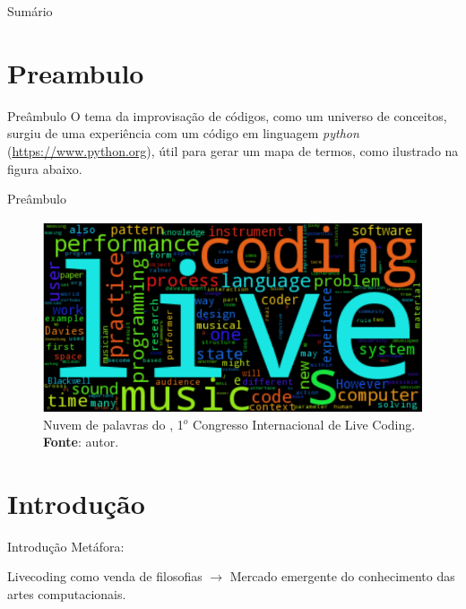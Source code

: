 \documentclass[aspectratio=169]{beamer}
\begin{document}


\begin{frame}{Sumário}
\tableofcontents
\end{frame}

\section{Preambulo}
\begin{frame}{Preâmbulo}
O tema da improvisação de códigos, como um universo de conceitos, surgiu de uma experiência com um código em linguagem \emph{python} (\url{https://www.python.org}), útil para gerar um mapa de termos, como ilustrado na figura abaixo.
\end{frame}

\begin{frame}{Preâmbulo}
\begin{figure}
\centering
\includegraphics[scale=0.8]{imagens/nuvem.png}
\caption{Nuvem de palavras do ,  1$^o$ Congresso Internacional de Live Coding. \textbf{Fonte}: autor.}
\label{fig:nuvemlivecoding}
\end{figure}
\end{frame}

\section{Introdução}
\begin{frame}{Introdução}
Metáfora:

Livecoding como venda de filosofias $\rightarrow$ Mercado emergente do conhecimento das artes computacionais.
\end{frame}
\end{document}

